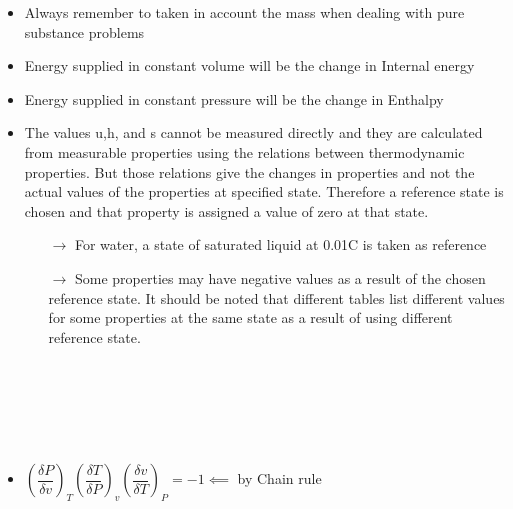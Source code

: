\documentclass[8pt]{article}
\begin{document}
	\begin{itemize}
		\item Always remember to taken in account the mass when dealing with pure substance problems
		\item Energy supplied in constant volume will be the change in Internal energy
		\item Energy supplied in constant pressure will be the change in Enthalpy
		\item The values u,h, and s cannot be measured directly and they are calculated from measurable properties using the relations between thermodynamic properties. But those relations give the changes in properties and not the actual values of the properties at specified state. Therefore a reference state is chosen and that property is assigned a value of zero at that state. 
			\begin{itemize}
				\item[$\rightarrow$] For water, a state of saturated liquid at 0.01\textdegree C is taken as reference
				\item[$\rightarrow$] Some properties may have negative values as a result of the chosen reference state. It should be noted that different tables list different values for some properties at the same state as a result of using different reference state. 
			\end{itemize}
	\end{itemize}\hrulefill\\\\
\begin{center}
\subsection*{}
\end{center}
\\
	\begin{itemize}
		\item $\left(\dfrac{\delta P}{\delta v}\right)_T\left(\dfrac{\delta T}{\delta P}\right)_v\left(\dfrac{\delta v}{\delta T}\right)_P = -1 \impliedby$ by Chain rule
	\end{itemize}\hrulefill\\\\
\end{document}
